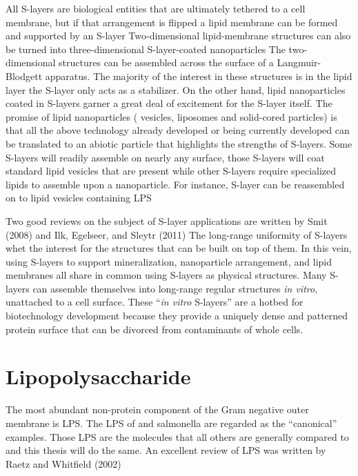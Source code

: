   All \acp{S-layer} are biological entities that are ultimately tethered to a cell membrane, but if that arrangement is flipped a lipid membrane can be formed and supported by an
\ac{S-layer} Two-dimensional lipid-membrane structures can also be turned into three-dimensional \ac{S-layer}-coated
nanoparticles The two-dimensional structures can be assembled across the surface of a Langmuir-Blodgett apparatus. The majority of the interest in
these structures is in the lipid layer the \ac{S-layer} only acts as a stabilizer. On the other hand, lipid nanoparticles coated in \acp{S-layer} garner a
great deal of excitement for the \ac{S-layer} itself. The promise of lipid nanoparticles (\ie{} vesicles, liposomes and solid-cored particles) is that all the above technology
already developed or being currently developed can be translated to an abiotic particle that highlights the strengths of \acp{S-layer}. Some \acp{S-layer} will readily assemble on
nearly any surface, those \acp{S-layer} will coat standard lipid vesicles that are present while other \acp{S-layer} require specialized lipids to assemble
upon a nanoparticle. For instance, \caulobacter \ac{S-layer} can be reassembled on to lipid vesicles containing \caulobacter{} \ac{LPS}
  
  Two good reviews on the subject of \ac{S-layer} applications are written by Smit (2008) and Ilk, Egelseer, and Sleytr (2011)  The
long-range uniformity of \acp{S-layer} whet the interest for the structures that can be built on top of them. In this vein, using \acp{S-layer} to support mineralization,
nanoparticle arrangement, and lipid membranes all share in common using \acp{S-layer} as physical structures.  Many \acp{S-layer} can assemble themselves into long-range regular
structures \textit{in vitro}, unattached to a cell surface. These ``\textit{in vitro} \acp{S-layer}'' are a hotbed for biotechnology development because they provide a uniquely
dense and patterned protein surface that can be divorced from contaminants of whole cells. %

\section{Lipopolysaccharide}\label{sec:intro-lps} %
 The most abundant non-protein component of the Gram negative
outer membrane is \ac{LPS}. The \ac{LPS} of \ecoli and \acl{salmonella} are regarded as the ``canonical'' examples. Those \ac{LPS} are the molecules that all others are generally
compared to and this thesis will do the same. An excellent review of \ac{LPS} was written by Raetz and Whitfield (2002)

